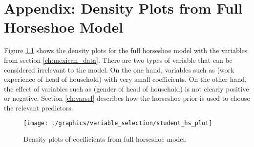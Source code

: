 \chapter{Appendix: Density Plots from Full Horseshoe Model}
\label{appendix:horseshoe_plot}

Figure \ref{fig:hs_dens} shows the density plots for the full horseshoe model with the variables from section \ref{ch:mexican_data}.
There are two types of variable that can be considered irrelevant to the model.
On the one hand, variables such as  (work experience of head of household) with very small coefficients.
On the other hand, the effect of variables such as  (gender of head of household) is not clearly positive or negative.
Section \ref{ch:varsel} describes how the horseshoe prior is used to choose the relevant predictors.

\begin{figure}[h]
    \texttt{[image: ./graphics/variable\_selection/student\_hs\_plot]}
    \caption{Density plots of coefficients from full horseshoe model.}
    \label{fig:hs_dens}
\end{figure}
